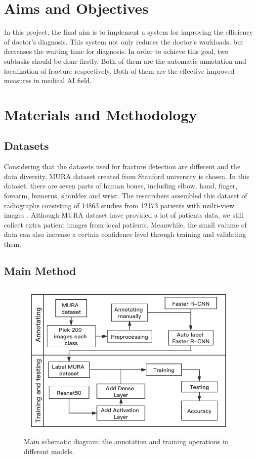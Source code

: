 \documentclass[12pt,oneside,a4paper]{article}
\begin{document}
\clearpage
\section{Aims and Objectives}
In this project, the final aim is to implement a system for improving the efficiency of doctor’s diagnosis. This system not only reduces the doctor’s workloads, but decreases the waiting time for diagnosis. In order to achieve this goal, two subtasks should be done firstly. Both of them are the automatic annotation and localization of fracture respectively. Both of them are the effective improved measures in medical AI field.


\clearpage
\section{Materials and Methodology}
\subsection{Datasets}
Considering that the datasets used for fracture detection are different and the data diversity, MURA dataset created from Stanford university is chosen. In this dataset, there are seven parts of human bones, including elbow, hand, finger, forearm, humerus, shoulder and wrist. The researchers assembled this dataset of radiographs consisting of 14863 studies from 12173 patients with multi-view images \cite{b3}. Although MURA dataset have provided a lot of patients data, we still collect extra patient images from local patients. Meanwhile, the small volume of data can also increase a certain confidence level through training and validating them.

\subsection{Main Method}

\begin{figure}
\begin{center}
\includegraphics[width=1\columnwidth]{images/architecture.png}
\caption{Main schematic diagram: the annotation and training operations in different models.}
\end{center}
\end{figure}
\end{document}
